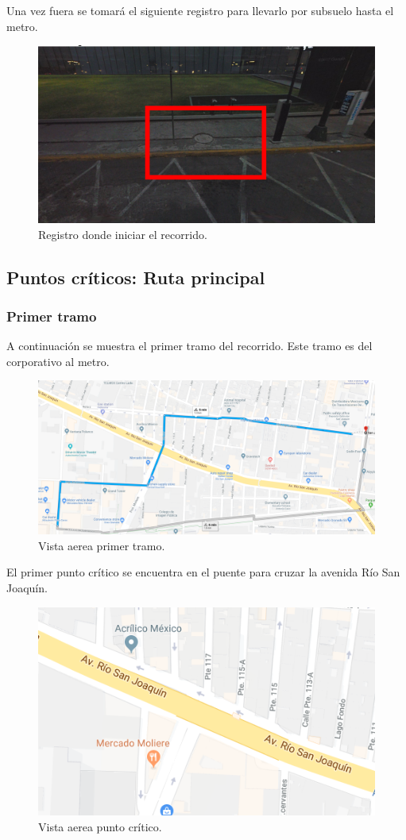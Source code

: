 \documentclass[12pt,letterpaper]{article}
\begin{document}
Una vez fuera se tomará el siguiente registro para llevarlo por 
subsuelo hasta el metro.
\begin{figure}[ht]
    \centering
    \includegraphics[width=.7\textwidth]{f1.png}
    \caption{Registro donde iniciar el recorrido.}
\end{figure}

\newpage
\subsection{Puntos críticos: Ruta principal}
\subsubsection{Primer tramo}
A continuación se muestra el primer tramo del recorrido. Este 
tramo es del corporativo al metro.
\begin{figure}[ht]
    \centering
    \includegraphics[width=.8\textwidth]{f5.png}
    \caption{Vista aerea primer tramo.}
\end{figure}

El primer punto crítico se encuentra en el puente para cruzar la 
avenida Río San Joaquín.
\begin{figure}[ht]
    \centering
    \includegraphics[width=.6\textwidth]{f4.png}
    \caption{Vista aerea punto crítico.}
\end{figure}
\end{document}
